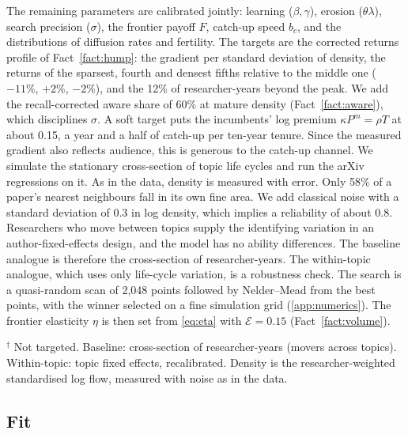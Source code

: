 The remaining parameters are calibrated jointly: learning ($\beta,\gamma$),
erosion ($\theta\lambda$), search precision ($\sigma$), the frontier payoff
$F$, catch-up speed $b_c$, and the distributions of diffusion rates and
fertility. The targets are the corrected returns profile of
Fact~\ref{fact:hump}: the gradient per standard deviation of density, the
returns of the sparsest, fourth and densest fifths relative to the middle one
($-11\%$, $+2\%$, $-2\%$), and the 12\% of researcher-years beyond the peak.
We add the recall-corrected aware share of 60\% at mature density
(Fact~\ref{fact:aware}), which disciplines $\sigma$. A soft target puts the
incumbents' log premium $\kappa P^m=\rho T$ at about 0.15, a year and a half of
catch-up per ten-year tenure. Since the measured gradient also reflects
audience, this is generous to the catch-up channel. We simulate the stationary
cross-section of topic life cycles and run the arXiv regressions on it. As in the
data, density is measured with error. Only 58\% of a paper's nearest neighbours
fall in its own fine area. We add classical noise with a standard deviation of
0.3 in log density, which implies a reliability of about 0.8. Researchers who
move between topics supply the identifying variation in an author-fixed-effects
design, and the model has no ability differences. The baseline analogue is
therefore the cross-section of researcher-years. The within-topic analogue,
which uses only life-cycle variation, is a robustness check. The search is a
quasi-random scan of 2,048 points followed by Nelder--Mead from the best points,
with the winner selected on a fine simulation grid (\cref{app:numerics}). The
frontier elasticity $\eta$ is then set from \eqref{eq:eta} with $\mathcal E=0.15$
(Fact~\ref{fact:volume}).

\begin{table}[t]
\centering\small
\caption{Parameters}\label{tab:calibration}

\end{table}

\begin{table}[t]
\centering\small
\caption{Fit to the arXiv facts}\label{tab:fit}

\par\smallskip\footnotesize
$^\dagger$ Not targeted. Baseline: cross-section of researcher-years (movers
across topics). Within-topic: topic fixed effects, recalibrated. Density is the
researcher-weighted standardised log flow, measured with noise as in the data.
\end{table}

\subsection{Fit}

